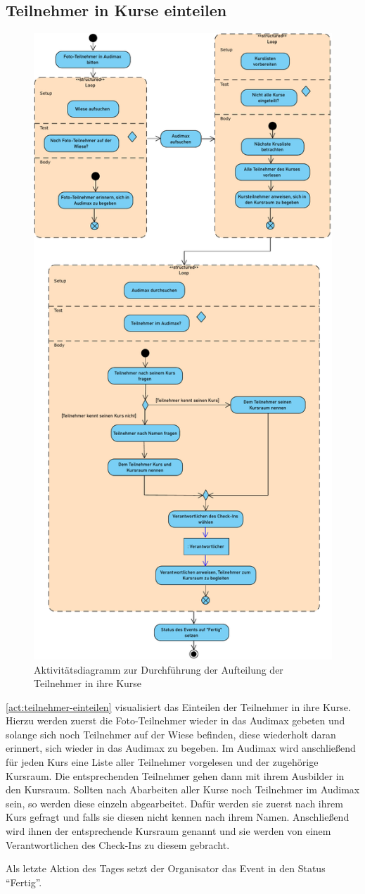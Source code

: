 \subsection{Teilnehmer in Kurse einteilen}
\begin{figure}[ht!]
    \centering
    \includegraphics[width=0.7\columnwidth]{Bilder/act_Teilnehmer_in_Kurse_einteilen.pdf}
    \caption{Aktivitätsdiagramm zur Durchführung der Aufteilung der Teilnehmer in ihre Kurse}
    \label{act:teilnehmer-einteilen}
\end{figure}

\autoref{act:teilnehmer-einteilen} visualisiert das Einteilen der Teilnehmer in ihre Kurse. Hierzu werden zuerst die Foto-Teilnehmer wieder in das Audimax gebeten und solange sich noch Teilnehmer auf der Wiese befinden, diese wiederholt daran erinnert, sich wieder in das Audimax zu begeben. Im Audimax wird anschließend für jeden Kurs eine Liste aller Teilnehmer vorgelesen und der zugehörige Kursraum. Die entsprechenden Teilnehmer gehen dann mit ihrem Ausbilder in den Kursraum. Sollten nach Abarbeiten aller Kurse noch Teilnehmer im Audimax sein, so werden diese einzeln abgearbeitet. Dafür werden sie zuerst nach ihrem Kurs gefragt und falls sie diesen nicht kennen nach ihrem Namen. Anschließend wird ihnen der entsprechende Kursraum genannt und sie werden von einem Verantwortlichen des Check-Ins zu diesem gebracht.

Als letzte Aktion des Tages setzt der Organisator das Event in den Status \enquote{Fertig}.
